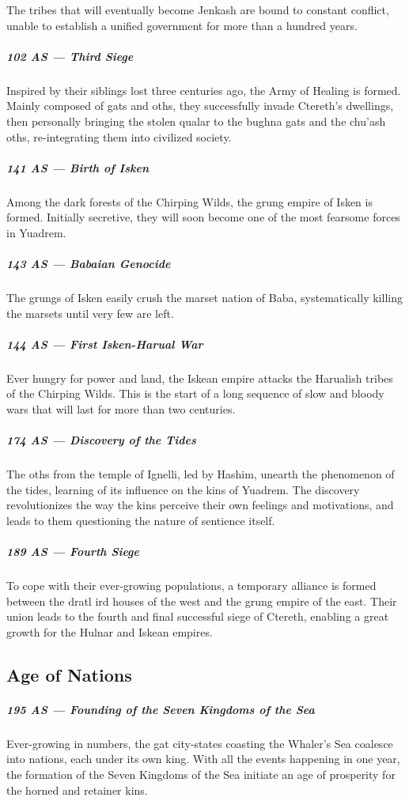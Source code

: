 The tribes that will eventually become Jenkash are bound to constant conflict, unable to establish a unified government for more than a hundred years.

\subparagraph{102 AS --- Third Siege} Inspired by their siblings lost three centuries ago, the Army of Healing is formed.
Mainly composed of gats and oths, they successfully invade Ctereth's dwellings, then personally bringing the stolen qualar to the bughna gats and the chu'ash oths, re-integrating them into civilized society.

\subparagraph{141 AS --- Birth of Isken} Among the dark forests of the Chirping Wilds, the grung empire of Isken is formed.
Initially secretive, they will soon become one of the most fearsome forces in Yuadrem.

\subparagraph{143 AS --- Babaian Genocide} The grungs of Isken easily crush the marset nation of Baba, systematically killing the marsets until very few are left.

\subparagraph{144 AS --- First Isken-Harual War} Ever hungry for power and land, the Iskean empire attacks the Harualish tribes of the Chirping Wilds.
This is the start of a long sequence of slow and bloody wars that will last for more than two centuries.

\subparagraph{174 AS --- Discovery of the Tides} The oths from the temple of Ignelli, led by Hashim, unearth the phenomenon of the tides, learning of its influence on the kins of Yuadrem.
The discovery revolutionizes the way the kins perceive their own feelings and motivations, and leads to them questioning the nature of sentience itself.

\subparagraph{189 AS --- Fourth Siege} To cope with their ever-growing populations, a temporary alliance is formed between the dratl ird houses of the west and the grung empire of the east.
Their union leads to the fourth and final successful siege of Ctereth, enabling a great growth for the Hulnar and Iskean empires.

\subsection*{Age of Nations}
\subparagraph{195 AS --- Founding of the Seven Kingdoms of the Sea} Ever-growing in numbers, the gat city-states coasting the Whaler's Sea coalesce into nations, each under its own king.
With all the events happening in one year, the formation of the Seven Kingdoms of the Sea initiate an age of prosperity for the horned and retainer kins.

